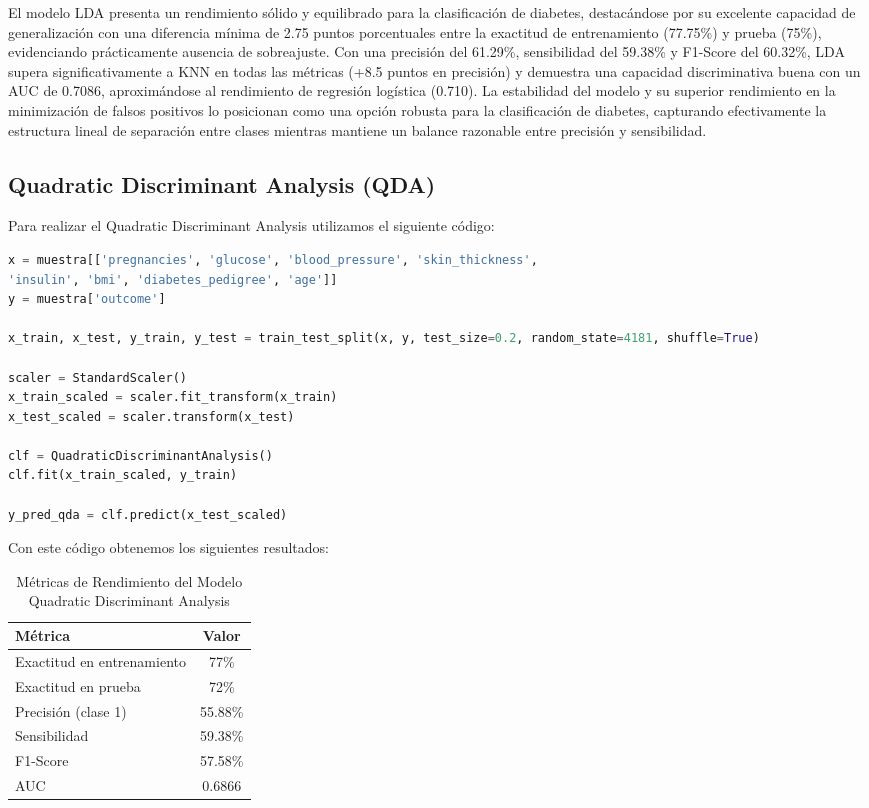 \documentclass[12pt,a4paper]{article}
\begin{document}
El modelo LDA presenta un rendimiento sólido y equilibrado para la clasificación de diabetes, destacándose por su excelente capacidad de generalización con una diferencia mínima de 2.75 puntos porcentuales entre la exactitud de entrenamiento (77.75\%) y prueba (75\%), evidenciando prácticamente ausencia de sobreajuste. Con una precisión del 61.29\%, sensibilidad del 59.38\% y F1-Score del 60.32\%, LDA supera significativamente a KNN en todas las métricas (+8.5 puntos en precisión) y demuestra una capacidad discriminativa buena con un AUC de 0.7086, aproximándose al rendimiento de regresión logística (0.710). La estabilidad del modelo y su superior rendimiento en la minimización de falsos positivos lo posicionan como una opción robusta para la clasificación de diabetes, capturando efectivamente la estructura lineal de separación entre clases mientras mantiene un balance razonable entre precisión y sensibilidad.

\vspace{1cm}

\subsection{Quadratic Discriminant Analysis (QDA)}

Para realizar el Quadratic Discriminant Analysis utilizamos el siguiente código:

\begin{lstlisting}[language=Python, frame=single, basicstyle=\ttfamily\small, breaklines=true]
x = muestra[['pregnancies', 'glucose', 'blood_pressure', 'skin_thickness',
'insulin', 'bmi', 'diabetes_pedigree', 'age']]
y = muestra['outcome']

x_train, x_test, y_train, y_test = train_test_split(x, y, test_size=0.2, random_state=4181, shuffle=True)

scaler = StandardScaler()
x_train_scaled = scaler.fit_transform(x_train)
x_test_scaled = scaler.transform(x_test)

clf = QuadraticDiscriminantAnalysis()
clf.fit(x_train_scaled, y_train)

y_pred_qda = clf.predict(x_test_scaled)
\end{lstlisting}

Con este código obtenemos los siguientes resultados:

\begin{table}[H]
\centering
\caption{Métricas de Rendimiento del Modelo Quadratic Discriminant Analysis}\label{tab:qda_resultados}
\begin{tabular}{lc}
\toprule
\textbf{Métrica} & \textbf{Valor} \\
\midrule
Exactitud en entrenamiento & 77\% \\
Exactitud en prueba & 72\% \\
Precisión (clase 1) & 55.88\% \\
Sensibilidad & 59.38\% \\
F1-Score & 57.58\% \\
AUC & 0.6866 \\
\bottomrule
\end{tabular}
\end{table}
\end{document}
